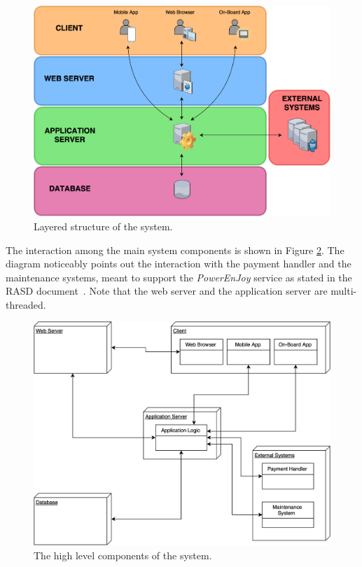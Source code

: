 \begin{figure}[H]
\begin{center}
		\includegraphics[width=\textwidth]{./arch_design/diagrams/system_layers.png}
		\caption{Layered structure of the system.}
		\label{sys_layers}
\end{center}
\end{figure}

The interaction among the main system components is shown in Figure \ref{sys_comps}. The diagram noticeably points out the interaction with the payment handler and the maintenance systems, meant to support the \emph{PowerEnJoy} service as stated in the RASD document~\cite{rasd}. Note that the web server and the application server are multi-threaded.

\begin{figure}[H]
\begin{center}
		\includegraphics[width=\textwidth]{./arch_design/diagrams/system_components.png}
		\caption{The high level components of the system.}
		\label{sys_comps}
\end{center}
\end{figure}
